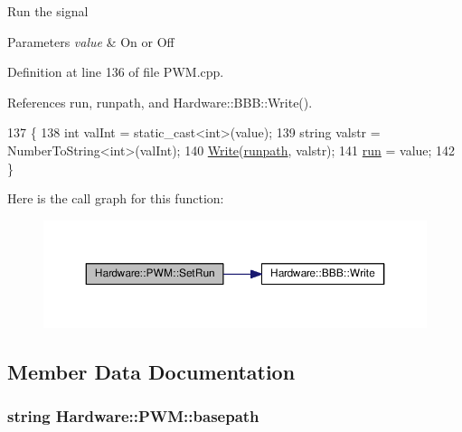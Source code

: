 Run the signal 


\begin{DoxyParams}{Parameters}
{\em value} & On or Off\\
\hline
\end{DoxyParams}


Definition at line 136 of file P\+W\+M.\+cpp.



References run, runpath, and Hardware\+::\+B\+B\+B\+::\+Write().


\begin{DoxyCode}
137     \{
138         \textcolor{keywordtype}{int} valInt = \textcolor{keyword}{static\_cast<}\textcolor{keywordtype}{int}\textcolor{keyword}{>}(value);
139         \textcolor{keywordtype}{string} valstr = NumberToString<int>(valInt);
140         \hyperlink{class_hardware_1_1_b_b_b_a155cc06f76d82a6b690ce5ea08e7c68e}{Write}(\hyperlink{class_hardware_1_1_p_w_m_ac1eb93467481ee2bd3565f1be47b8a01}{runpath}, valstr);
141         \hyperlink{class_hardware_1_1_p_w_m_a04531646b41accced24d46046c4bc7de}{run} = value;
142     \}
\end{DoxyCode}


Here is the call graph for this function\+:\nopagebreak
\begin{figure}[H]
\begin{center}
\leavevmode
\includegraphics[width=350pt]{class_hardware_1_1_p_w_m_a73b5f0047d4eb62f93f72745124fca73_cgraph}
\end{center}
\end{figure}




\subsection{Member Data Documentation}
\hypertarget{class_hardware_1_1_p_w_m_a344f82a0812dceb40aa48d4789d09c68}{}
\subsubsection[{basepath}]{\setlength{\rightskip}{0pt plus 5cm}string Hardware\+::\+P\+W\+M\+::basepath\hspace{0.3cm}{\ttfamily [private]}}\label{class_hardware_1_1_p_w_m_a344f82a0812dceb40aa48d4789d09c68}


